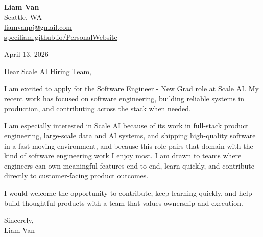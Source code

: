 \documentclass[letterpaper,11pt]{article}
\begin{document}
\begin{flushleft}
\textbf{\Large Liam Van} \\
Seattle, WA \\
\href{mailto:liamvanpj@gmail.com}{liamvanpj@gmail.com} \\
\href{https://speciliam.github.io/PersonalWebsite}{speciliam.github.io/PersonalWebsite}
\end{flushleft}

April 13, 2026

\noindent Dear Scale AI Hiring Team,

\noindent I am excited to apply for the Software Engineer - New Grad role at Scale AI. My recent work has focused on software engineering, building reliable systems in production, and contributing across the stack when needed.

\noindent I am especially interested in Scale AI because of its work in full-stack product engineering, large-scale data and AI systems, and shipping high-quality software in a fast-moving environment, and because this role pairs that domain with the kind of software engineering work I enjoy most. I am drawn to teams where engineers can own meaningful features end-to-end, learn quickly, and contribute directly to customer-facing product outcomes.

\noindent I would welcome the opportunity to contribute, keep learning quickly, and help build thoughtful products with a team that values ownership and execution.

\noindent Sincerely, \\
Liam Van
\end{document}
